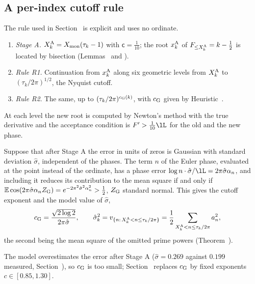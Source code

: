 \subsection{A per-index cutoff rule}
\label{subsec:rule}
The rule used in Section~ is explicit and uses no ordinate.
\begin{enumerate}[leftmargin=2em,label=(\roman*)]
\item \emph{Stage A.} $X^{\rm A}_k=X_{\rm mon}(\tau_k-1)$ with $\mathsf c=\frac1{10}$; the root $x^{\rm A}_k$ of $F_{\le X^{\rm A}_k}=k-\frac12$ is located by bisection (Lemmas~ and ).
\item \emph{Rule R1.} Continuation from $x^{\rm A}_k$ along six geometric levels from $X^{\rm A}_k$ to $(\tau_k/2\pi)^{1/2}$, the Nyquist cutoff.
\item \emph{Rule R2.} The same, up to $(\tau_k/2\pi)^{c_{\rm G}(k)}$, with $c_{\rm G}$ given by Heuristic~.
\end{enumerate}
At each level the new root is computed by Newton's method with the true derivative and the acceptance condition is $F'>\frac1{10}\lL$ for the old and the new phase.

\begin{heuristic}\label{heur:gaussian_cutoff}
Suppose that after Stage A the error in units of zeros is Gaussian with standard deviation $\hat\sigma$, independent of the phases. The term $n$ of the Euler phase, evaluated at the point instead of the ordinate, has a phase error $\log n\cdot\hat\sigma/\lL=2\pi\hat\sigma\alpha_n$, and including it reduces its contribution to the mean square if and only if $\mathbb E\cos(2\pi\hat\sigma\alpha_nZ_{\rm G})=e^{-2\pi^2\hat\sigma^2\alpha_n^2}>\frac12$, $Z_{\rm G}$ standard normal. This gives the cutoff exponent and the model value of $\hat\sigma$,
\begin{equation}
c_{\rm G}=\frac{\sqrt{2\log2}}{2\pi\hat\sigma},\qquad \hat\sigma_k^2=v_{\{n:\,X^{\rm A}_k<n\le\tau_k/2\pi\}}=\frac12\sum_{X^{\rm A}_k<n\le\tau_k/2\pi}a_n^2 ,
\label{eq:gaussian_cutoff}
\end{equation}
the second being the mean square of the omitted prime powers (Theorem~).
\end{heuristic}

The model overestimates the error after Stage A ($\hat\sigma=0.269$ against $0.199$ measured, Section~), so $c_{\rm G}$ is too small; Section~ replaces $c_{\rm G}$ by fixed exponents $c\in[0.85,1.30]$.

